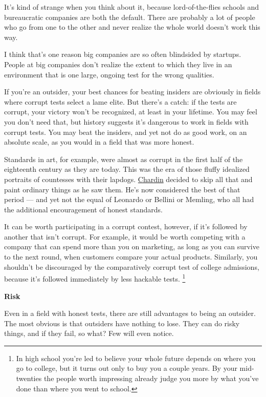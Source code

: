 It's kind of strange when you think about it, because lord-of-the-flies
schools and bureaucratic companies are both the default. There are
probably a lot of people who go from one to the other and never realize
the whole world doesn't work this way.

I think that's one reason big companies are so often blindsided by
startups. People at big companies don't realize the extent to which they
live in an environment that is one large, ongoing test for the wrong
qualities.

If you're an outsider, your best chances for beating insiders are
obviously in fields where corrupt tests select a lame elite. But there's
a catch: if the tests are corrupt, your victory won't be recognized, at
least in your lifetime. You may feel you don't need that, but history
suggests it's dangerous to work in fields with corrupt tests. You may
beat the insiders, and yet not do as good work, on an absolute scale, as
you would in a field that was more honest.

Standards in art, for example, were almost as corrupt in the first half
of the eighteenth century as they are today. This was the era of those
fluffy idealized portraits of countesses with their lapdogs.
\href{largilliere-chardin.html}{Chardin} decided to skip all that and
paint ordinary things as he saw them. He's now considered the best of
that period --- and yet not the equal of Leonardo or Bellini or Memling,
who all had the additional encouragement of honest standards.

It can be worth participating in a corrupt contest, however, if it's
followed by another that isn't corrupt. For example, it would be worth
competing with a company that can spend more than you on marketing, as
long as you can survive to the next round, when customers compare your
actual products. Similarly, you shouldn't be discouraged by the
comparatively corrupt test of college admissions, because it's followed
immediately by less hackable tests. \footnote{In high school you're led to believe your whole future depends
on where you go to college, but it turns out only to buy you a couple
years. By your mid-twenties the people worth impressing already judge
you more by what you've done than where you went to school.}

\textbf{Risk}

Even in a field with honest tests, there are still advantages to being
an outsider. The most obvious is that outsiders have nothing to lose.
They can do risky things, and if they fail, so what? Few will even
notice.

